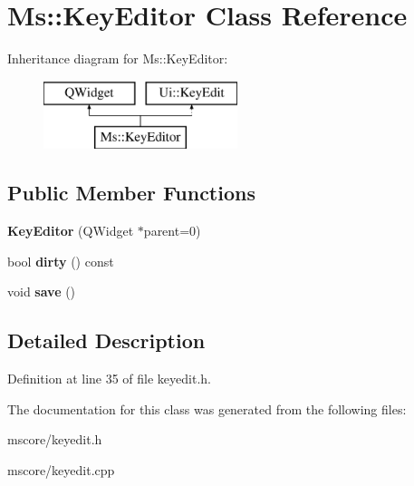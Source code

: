 \hypertarget{class_ms_1_1_key_editor}{}\section{Ms\+:\+:Key\+Editor Class Reference}
\label{class_ms_1_1_key_editor}
Inheritance diagram for Ms\+:\+:Key\+Editor\+:\begin{figure}[H]
\begin{center}
\leavevmode
\includegraphics[height=2.000000cm]{class_ms_1_1_key_editor}
\end{center}
\end{figure}
\subsection*{Public Member Functions}
\begin{DoxyCompactItemize}
\item 
\mbox{\label{class_ms_1_1_key_editor_a6520a8c1ec8a884fec50d4e2419e731d}} 
{\bfseries Key\+Editor} (Q\+Widget $\ast$parent=0)
\item 
\mbox{\label{class_ms_1_1_key_editor_a7077450fb84108ce30c6f2679494427d}} 
bool {\bfseries dirty} () const
\item 
\mbox{\label{class_ms_1_1_key_editor_a426581e25cec980a06437c45213490f9}} 
void {\bfseries save} ()
\end{DoxyCompactItemize}


\subsection{Detailed Description}


Definition at line 35 of file keyedit.\+h.



The documentation for this class was generated from the following files\+:\begin{DoxyCompactItemize}
\item 
mscore/keyedit.\+h\item 
mscore/keyedit.\+cpp\end{DoxyCompactItemize}
